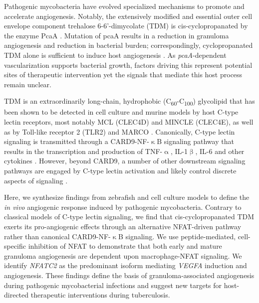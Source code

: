 Pathogenic mycobacteria have evolved specialized mechanisms to promote and accelerate angiogenesis. Notably, the extensively modified and essential outer cell envelope component trehalose 6-6'-dimycolate (TDM) is cis-cyclopropanated by the enzyme PcaA \citep{Glickman2000, Rao2005}. Mutation of pcaA results in a reduction in granuloma angiogenesis and reduction in bacterial burden; correspondingly, cyclopropanated TDM alone is sufficient to induce host angiogenesis \citep{Saita2000, Sakaguchi2000, Walton2018}. As \textit{pcaA}-dependent vascularization supports bacterial growth, factors driving this represent potential sites of therapeutic intervention yet the signals that mediate this host process remain unclear.

TDM is an extraordinarily long-chain, hydrophobic (C\textsubscript{60}-C\textsubscript{100}) glycolipid \citep{Noll1956a, Noll1956b, Hunter2006a, Behling1993} that has been shown to be detected in cell culture and murine models by host C-type lectin receptors, most notably MCL (CLEC4D) and MINCLE (CLEC4E), as well as by Toll-like receptor 2 (TLR2) and MARCO \citep{Bowdish2009, Matsunaga2009, Miyake2013, Ishikawa2009}. Canonically, C-type lectin signaling is transmitted through a CARD9-NF-$\upkappa$B signaling pathway that results in the transcription and production of TNF-$\upalpha$, IL-1$\upbeta$, IL-6 and other cytokines \citep{Yamasaki2008, Goodridge2009, LobatoPascual2013, Zhao2014, Deerhake2021}. However, beyond CARD9, a number of other downstream signaling pathways are engaged by C-type lectin activation and likely control discrete aspects of signaling \citep{Goodridge2007, Deerhake2021}.

Here, we synthesize findings from zebrafish and cell culture models to define the \textit{in vivo} angiogenic response induced by pathogenic mycobacteria. Contrary to classical models of C-type lectin signaling, we find that cis-cyclopropanated TDM exerts its pro-angiogenic effects through an alternative NFAT-driven pathway rather than canonical CARD9-NF-$\upkappa$B signaling. We use peptide-mediated, cell-specific inhibition of NFAT to demonstrate that both early and mature granuloma angiogenesis are dependent upon macrophage-NFAT signaling. We identify \textit{NFATC2} as the predominant isoform mediating \textit{VEGFA} induction and angiogenesis. These findings define the basis of granuloma-associated angiogenesis during pathogenic mycobacterial infections and suggest new targets for host-directed therapeutic interventions during tuberculosis.

